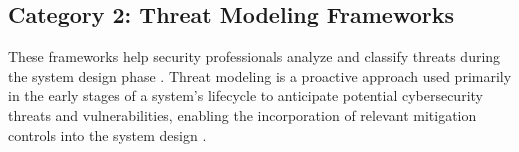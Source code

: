 
\subsection{Category 2: Threat Modeling Frameworks}
These frameworks help security professionals analyze and classify threats during the system design phase \cite{huang2024security, ouaissa2025smartcity}. Threat modeling is a proactive approach used primarily in the early stages of a system's lifecycle to anticipate potential cybersecurity threats and vulnerabilities, enabling the incorporation of relevant mitigation controls into the system design \cite{huang2024security, owasp2024threatmodeling}.
